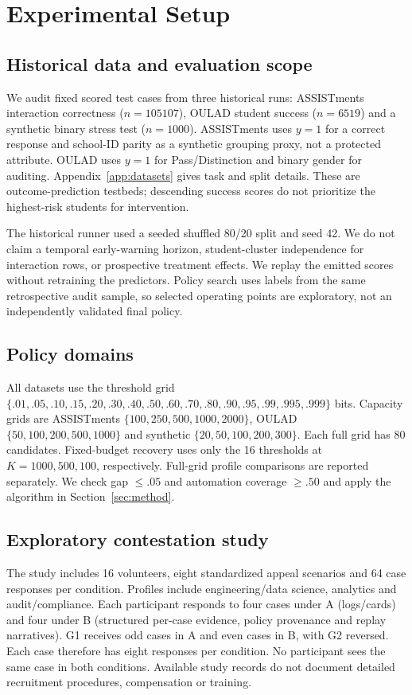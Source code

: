\section{Experimental Setup}
\label{sec:experiments}
\subsection{Historical data and evaluation scope}
We audit fixed scored test cases from three historical runs: ASSISTments interaction correctness ($n=105107$), OULAD student success ($n=6519$) and a synthetic binary stress test ($n=1000$). ASSISTments uses $y=1$ for a correct response and school-ID parity as a synthetic grouping proxy, not a protected attribute. OULAD uses $y=1$ for Pass/Distinction and binary gender for auditing. Appendix~\ref{app:datasets} gives task and split details. These are outcome-prediction testbeds; descending success scores do not prioritize the highest-risk students for intervention.

The historical runner used a seeded shuffled 80/20 split and seed 42. We do not claim a temporal early-warning horizon, student-cluster independence for interaction rows, or prospective treatment effects. We replay the emitted scores without retraining the predictors. Policy search uses labels from the same retrospective audit sample, so selected operating points are exploratory, not an independently validated final policy.

\subsection{Policy domains}
All datasets use the threshold grid $\{.01,\allowbreak .05,\allowbreak .10,\allowbreak .15,\allowbreak .20,\allowbreak .30,\allowbreak .40,\allowbreak .50,\allowbreak .60,\allowbreak .70,\allowbreak .80,\allowbreak .90,\allowbreak .95,\allowbreak .99,\allowbreak .995,\allowbreak .999\}$ bits. Capacity grids are ASSISTments $\{100,\allowbreak 250,\allowbreak 500,\allowbreak 1000,\allowbreak 2000\}$, OULAD $\{50,100,200,500,1000\}$ and synthetic $\{20,50,100,200,300\}$. Each full grid has 80 candidates. Fixed-budget recovery uses only the 16 thresholds at $K=1000,500,100$, respectively. Full-grid profile comparisons are reported separately. We check gap $\leq.05$ and automation coverage $\geq.50$ and apply the algorithm in Section~\ref{sec:method}.

\subsection{Exploratory contestation study}
\label{sec:human-study}
The study includes 16 volunteers, eight standardized appeal scenarios and 64 case responses per condition. Profiles include engineering/data science, analytics and audit/compliance. Each participant responds to four cases under A (logs/cards) and four under B (structured per-case evidence, policy provenance and replay narratives). G1 receives odd cases in A and even cases in B, with G2 reversed. Each case therefore has eight responses per condition. No participant sees the same case in both conditions. Available study records do not document detailed recruitment procedures, compensation or training.

